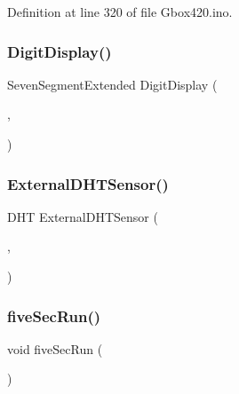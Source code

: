 Definition at line 320 of file Gbox420.\+ino.

\mbox{\label{_gbox420_8ino_a2a5f059bc1d0b6f05063c655ac1ae398}} 
\subsubsection{\texorpdfstring{DigitDisplay()}{DigitDisplay()}}
{\footnotesize\ttfamily Seven\+Segment\+Extended Digit\+Display (\begin{DoxyParamCaption}\item[{\mbox{\hyperlink{420_pins_8h_adb1e212b16f1e3f4084695b7447adcaf}{Digit\+Display\+C\+L\+K\+Out\+Pin}}}]{,  }\item[{\mbox{\hyperlink{420_pins_8h_aabf655d6bafe568ddf231736884f2f02}{Digit\+Display\+D\+I0\+Out\+Pin}}}]{ }\end{DoxyParamCaption})}

\mbox{\label{_gbox420_8ino_a7ea7d734b9d426453567372a04e101a2}} 
\subsubsection{\texorpdfstring{ExternalDHTSensor()}{ExternalDHTSensor()}}
{\footnotesize\ttfamily D\+HT External\+D\+H\+T\+Sensor (\begin{DoxyParamCaption}\item[{\mbox{\hyperlink{420_pins_8h_ab7204e8321ecef66088c3377c358b17f}{External\+D\+H\+T\+Sensor\+In\+Pin}}}]{,  }\item[{\mbox{\hyperlink{_gbox420_8ino_adc7a68db9f5a31bc91546195883a2bbc}{D\+H\+T\+Type}}}]{ }\end{DoxyParamCaption})}

\mbox{\label{_gbox420_8ino_a2e87663d43b502972c5607223fb5e7d2}} 
\subsubsection{\texorpdfstring{fiveSecRun()}{fiveSecRun()}}
{\footnotesize\ttfamily void five\+Sec\+Run (\begin{DoxyParamCaption}{ }\end{DoxyParamCaption})}




